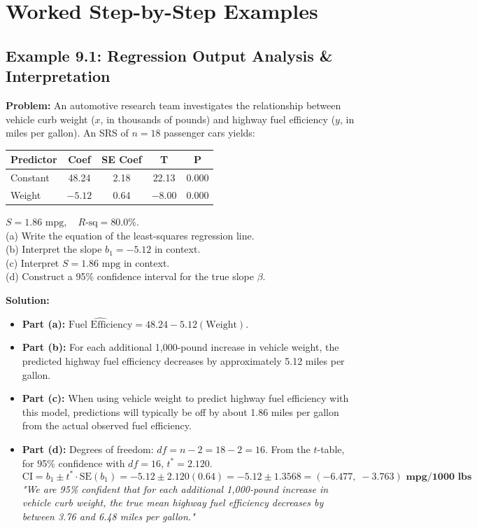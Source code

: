\section{Worked Step-by-Step Examples}

\subsection*{Example 9.1: Regression Output Analysis \& Interpretation}
\textbf{Problem:} An automotive research team investigates the relationship between vehicle curb weight ($x$, in thousands of pounds) and highway fuel efficiency ($y$, in miles per gallon). An SRS of $n = 18$ passenger cars yields:
\begin{center}
\begin{tabular}{lcccc}
\toprule
\textbf{Predictor} & \textbf{Coef} & \textbf{SE Coef} & \textbf{T} & \textbf{P} \\
\midrule
Constant & 48.24 & 2.18 & 22.13 & 0.000 \\
Weight & $-5.12$ & 0.64 & $-8.00$ & 0.000 \\
\bottomrule
\end{tabular}
\end{center}
$S = 1.86\text{ mpg}, \quad R\text{-sq} = 80.0\%$.\\
(a) Write the equation of the least-squares regression line.\\
(b) Interpret the slope $b_1 = -5.12$ in context.\\
(c) Interpret $S = 1.86\text{ mpg}$ in context.\\
(d) Construct a 95\% confidence interval for the true slope $\beta$.

\textbf{Solution:}
\begin{itemize}[leftmargin=1.2em]
  \item \textbf{Part (a):} $\widehat{\text{Fuel Efficiency}} = 48.24 - 5.12(\text{Weight})$.
  \item \textbf{Part (b):} For each additional 1,000-pound increase in vehicle weight, the predicted highway fuel efficiency decreases by approximately 5.12 miles per gallon.
  \item \textbf{Part (c):} When using vehicle weight to predict highway fuel efficiency with this model, predictions will typically be off by about 1.86 miles per gallon from the actual observed fuel efficiency.
  \item \textbf{Part (d):} Degrees of freedom: $df = n - 2 = 18 - 2 = 16$.
  From the $t$-table, for 95\% confidence with $df = 16$, $t^* = 2.120$.\\
  \[ \text{CI} = b_1 \pm t^* \cdot \text{SE}(b_1) = -5.12 \pm 2.120(0.64) = -5.12 \pm 1.3568 = \mathbf{(-6.477, \; -3.763)\text{ mpg/1000 lbs}} \]
  \textit{"We are 95\% confident that for each additional 1,000-pound increase in vehicle curb weight, the true mean highway fuel efficiency decreases by between 3.76 and 6.48 miles per gallon."}
\end{itemize}

